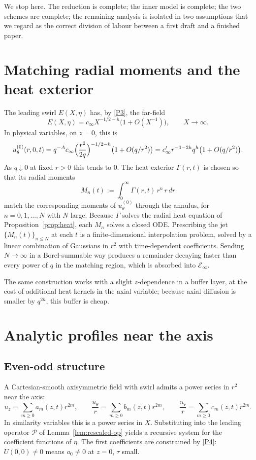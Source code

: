 We stop here. The reduction is complete; the inner model is complete; the two schemes are complete; the remaining analysis is isolated in two assumptions that we regard as the correct division of labour between a first draft and a finished paper.

\appendix
\section{Matching radial moments and the heat exterior}
\label{app:moments}

The leading swirl $E(X,\eta)$ has, by \ref{P3}, the far-field
\[
E(X,\eta)=c_\infty X^{-1/2-h}\bigl(1+O(X^{-1})\bigr),
\qquad X\to\infty.
\]
In physical variables, on $z=0$, this is
\[
u^{(0)}_\theta(r,0,t)
=q^{-A} c_\infty \Bigl(\frac{r^2}{2q}\Bigr)^{-1/2-h}\bigl(1+O(q/r^2)\bigr)
=c_\infty' r^{-1-2h} q^{h}\bigl(1+O(q/r^2)\bigr).
\]
As $q\downarrow 0$ at fixed $r>0$ this tends to $0$. The heat exterior $\Gamma(r,t)$ is chosen so that its radial moments
\[
M_n(t):=\int_0^\infty \Gamma(r,t)\, r^{n}\, r\,dr
\]
match the corresponding moments of $u^{(0)}_\theta$ through the annulus, for $n=0,1,\dots,N$ with $N$ large. Because $\Gamma$ solves the radial heat equation of Proposition~\ref{prop:heat}, each $M_n$ solves a closed ODE. Prescribing the jet $\{M_n(t)\}_{n\le N}$ at each $t$ is a finite-dimensional interpolation problem, solved by a linear combination of Gaussians in $r^2$ with time-dependent coefficients. Sending $N\to\infty$ in a Borel-summable way produces a remainder decaying faster than every power of $q$ in the matching region, which is absorbed into $\mathcal E_{\infty}$.

The same construction works with a slight $z$-dependence in a buffer layer, at the cost of additional heat kernels in the axial variable; because axial diffusion is smaller by $q^{2h}$, this buffer is cheap.

\section{Analytic profiles near the axis}
\label{app:axis}

\subsection{Even-odd structure}

A Cartesian-smooth axisymmetric field with swirl admits a power series in $r^2$ near the axis:
\[
u_z=\sum_{m\ge 0} a_m(z,t) r^{2m},
\qquad
\frac{u_\theta}{r}=\sum_{m\ge 0} b_m(z,t) r^{2m},
\qquad
\frac{u_r}{r}=\sum_{m\ge 0} c_m(z,t) r^{2m}.
\]
In similarity variables this is a power series in $X$. Substituting into the leading operator $\mathcal P$ of Lemma~\ref{lem:rescaled-op} yields a recursive system for the coefficient functions of $\eta$. The first coefficients are constrained by \ref{P4}: $U(0,0)\neq 0$ means $a_0\neq 0$ at $z=0$, $\tau$ small.

